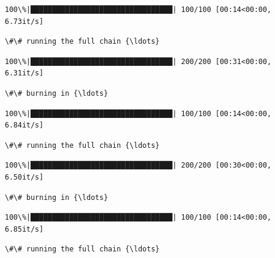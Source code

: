 \documentclass[11pt]{article}
\begin{document}
    \begin{Verbatim}[commandchars=\\\{\}]
100\%|█████████████████████████████████| 100/100 [00:14<00:00,  6.73it/s]
    \end{Verbatim}

    \begin{Verbatim}[commandchars=\\\{\}]
\#\# running the full chain {\ldots}
    \end{Verbatim}

    \begin{Verbatim}[commandchars=\\\{\}]
100\%|█████████████████████████████████| 200/200 [00:31<00:00,  6.31it/s]
    \end{Verbatim}

    \begin{Verbatim}[commandchars=\\\{\}]
\#\# burning in {\ldots}
    \end{Verbatim}

    \begin{Verbatim}[commandchars=\\\{\}]
100\%|█████████████████████████████████| 100/100 [00:14<00:00,  6.84it/s]
    \end{Verbatim}

    \begin{Verbatim}[commandchars=\\\{\}]
\#\# running the full chain {\ldots}
    \end{Verbatim}

    \begin{Verbatim}[commandchars=\\\{\}]
100\%|█████████████████████████████████| 200/200 [00:30<00:00,  6.50it/s]
    \end{Verbatim}

    \begin{Verbatim}[commandchars=\\\{\}]
\#\# burning in {\ldots}
    \end{Verbatim}

    \begin{Verbatim}[commandchars=\\\{\}]
100\%|█████████████████████████████████| 100/100 [00:14<00:00,  6.85it/s]
    \end{Verbatim}

    \begin{Verbatim}[commandchars=\\\{\}]
\#\# running the full chain {\ldots}
    \end{Verbatim}
\end{document}
